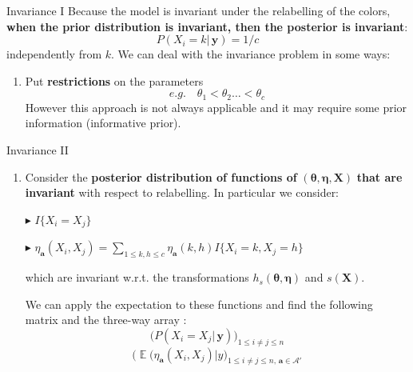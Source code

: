 \documentclass[aspectratio=169,xcolor=dvipsnames]{beamer}
\DeclareMathOperator{\E}{\mathbb{E}}
\newcommand{\veca}{\boldsymbol{a}}
\newcommand{\seta}{\mathcal{A}}
\newcommand{\vecy}{\textbf{y}}
\newcommand{\matx}{\textbf{X}}
\newcommand{\veceta}{\boldsymbol{\eta}}
\newcommand{\vectheta}{\boldsymbol{\theta}}
\begin{document}
\begin{frame}{Invariance I}
Because the model is invariant under the relabelling of the colors, \textbf{when the prior distribution is invariant, then the posterior is invariant}:
    $$
    P(X_i=k| \, \vecy) = 1/c 
    $$
independently from $k$.  We can deal with the invariance problem in some ways: 

\begin{enumerate}
    \item  Put \textbf{restrictions} on the parameters
    $$
    e.g. \quad \theta_1 < \theta_2 \dots < \theta_c
    $$
    However this approach is not always applicable and it may require some prior information (informative prior).
\end{enumerate}
\end{frame}
\begin{frame}{Invariance II}
\begin{enumerate}
    \item Consider the \textbf{posterior distribution of functions of} $(\vectheta, \veceta, \matx )$ \textbf{that are invariant} with respect to relabelling.  In particular we consider:
    \vspace{5pt}
    \addtolength{\itemindent}{24pt}
        \item[$\blacktriangleright$] $I\{X_i = X_j\}$
        
        \item[$\blacktriangleright$] $\eta_{\veca}(X_i,X_j) = \displaystyle\sum_{1\leq k, h\leq c}\eta_{\veca}(k,h) I\{X_i = k, X_j = h\}$
    \addtolength{\itemindent}{-24pt}
    \vspace{5pt}
    
    \item[] which are invariant w.r.t. the transformations $ h_s(\vectheta, \veceta)$ and $s(\matx)$.
    
    \item[] We can apply the expectation to these functions and find the following matrix and the three-way array :
    $$
    \bigg(P(X_i=X_j | \, \vecy)\bigg)_{1\leq i \neq j \leq n}
    $$
    $$
    \bigg( \E(\eta_{\veca}(X_i,X_j)|y\bigg)_{1\leq i \neq j \leq n, \, \veca \in \seta'}
    $$
\end{enumerate}

\end{frame}
\end{document}
